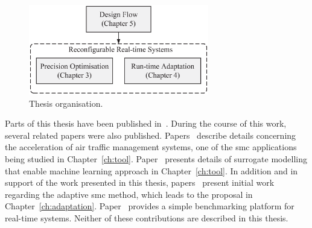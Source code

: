 \begin{figure}[ht]
\begin{center}
\includegraphics[width=0.7\textwidth]{1_introduction/figures/organisation}
\end{center}
\caption{Thesis organisation.}
\label{fig:intro_organisation}
\end{figure}

Parts of this thesis have been published in~\cite{chau13fpt,chau13arc,chau14trets,chau14fccm}.
During the course of this work, several related papers were also published.
Papers~\cite{chau13acm,eele13cdc,eele13gnc} describe details concerning the acceleration of air traffic management systems, one of the \gls{smc} applications being studied in Chapter~\ref{ch:tool}.
Paper~\cite{kurek14fccm} presents details of surrogate modelling that enable machine learning approach in Chapter~\ref{ch:tool}.
In addition and in support of the work presented in this thesis, papers~\cite{chau12fpl,niu13fccm} present initial work regarding the adaptive \gls{smc} method, which leads to the proposal in Chapter~\ref{ch:adaptation}.
Paper~\cite{chau12heart} provides a simple benchmarking platform for real-time systems.
Neither of these contributions are described in this thesis.



